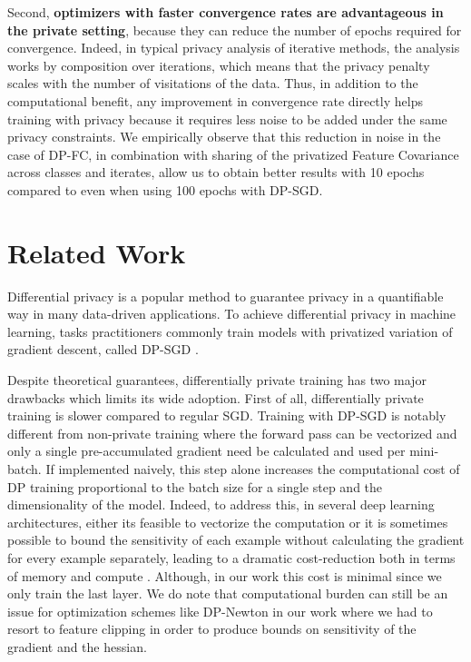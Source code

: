 \documentclass[letterpaper]{article} \usepackage{fullpage}
\begin{document}
Second, \textbf{optimizers with faster convergence rates are advantageous in the private setting}, because they can reduce the number of epochs required for convergence. Indeed, in typical privacy analysis of iterative methods, the analysis works by composition over iterations, which means that the privacy penalty scales with the number of visitations of the data. Thus, in addition to the computational benefit, any improvement in convergence rate directly helps training with privacy because it requires less noise to be added under the same privacy constraints. We empirically observe that this reduction in noise in the case of DP-FC, in combination with sharing of the privatized Feature Covariance across classes and iterates, allow us to obtain better results with 10 epochs compared to even when using 100 epochs with DP-SGD.

\section{Related Work}


Differential privacy \cite{dwork2006dp} is a popular method to guarantee privacy in a quantifiable way in many data-driven applications. To achieve differential privacy in machine learning, tasks practitioners commonly train models with privatized variation of gradient descent, called DP-SGD \citep{song2013stochastic,Bassily_2014,abadi2016dpsgd}. 

Despite theoretical guarantees, differentially private training has two major drawbacks which limits its wide adoption. First of all, differentially private training is slower compared to regular SGD. Training with DP-SGD is notably different from non-private training where the forward pass can be vectorized and only a single pre-accumulated gradient need be calculated and used per mini-batch. If implemented naively, this step alone increases the computational cost of DP training proportional to the batch size for a single step and the dimensionality of the model. Indeed, to address this, in several deep learning architectures, either its feasible to vectorize the computation \citep{subramani2020fastdpsgd} or it is sometimes possible to bound the sensitivity of each example without calculating the gradient for every example separately, leading to a dramatic cost-reduction both in terms of memory and compute \citep{Goodfellow2015EfficientPG,li2022llmdp, bu2022scalable_oldsota,Bu2022DifferentiallyPO}. Although, in our work this cost is minimal since we only train the last layer. We do note that computational burden can still be an issue for optimization schemes like DP-Newton in our work where we had to resort to feature clipping in order to produce bounds on sensitivity of the gradient and the hessian.
\end{document}
